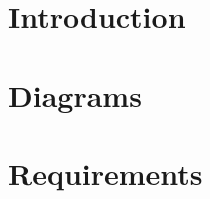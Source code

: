 \documentclass[11pt,a5paper,footinclude=true,headinclude=true]{report} %
\begin{document}
  




	\tableofcontents 
	\part{Introduction}


  
  
\part{Diagrams}    



\part{Requirements}






\end{document}
